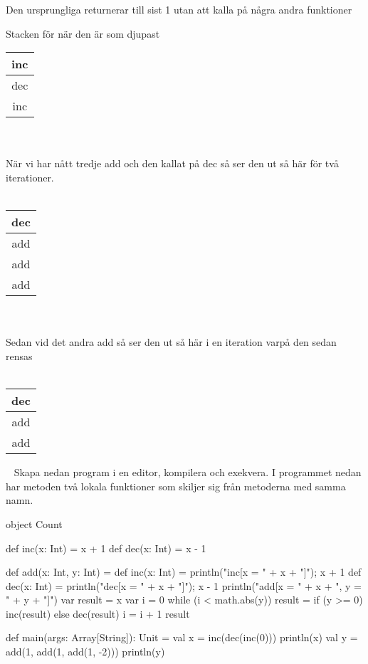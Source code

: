 Den ursprungliga  returnerar till sist 1 utan att kalla på några andra funktioner

\SubtaskSolved
Stacken för  när den är som djupast

\begin{tabular}{|c|}
\hline
inc \\
\hline
dec\\
\hline
inc \\
\hline
\end{tabular}
\\
\\
När vi har nått tredje add och den kallat på dec så ser den ut så här för två iterationer.
\\
\\
\begin{tabular}{|c|}

\hline
dec \\
\hline
add \\
\hline
add\\
\hline
add \\
\hline
\end{tabular}
\\
\\
Sedan vid det andra add så ser den ut så här i en iteration varpå den sedan rensas
\\
\\
\begin{tabular}{|c|}

\hline
dec \\
\hline
add \\
\hline
add\\
\hline
\end{tabular}



\QUESTEND









\QUESTBEGIN

\Task  \what~  Skapa nedan program i en editor, kompilera och exekvera. I programmet nedan har metoden  två lokala funktioner som skiljer sig från metoderna med samma namn.
\begin{Code}
object Count {
  def inc(x: Int) = x + 1
  def dec(x: Int) = x - 1

  def add(x: Int, y: Int) = {
    def inc(x: Int) = {println("inc[x = " + x + "]"); x + 1}
    def dec(x: Int) = {println("dec[x = " + x + "]"); x - 1}
    println("add[x = " + x + ", y = " + y + "]")
    var result = x
    var i = 0
    while (i < math.abs(y)){
      result = if (y >= 0) inc(result) else dec(result)
      i = i + 1
    }
    result
  }

  def main(args: Array[String]): Unit = {
    val x =  inc(dec(inc(0)))
    println(x)
    val y = add(1, add(1, add(1, -2)))
    println(y)
  }
}
\end{Code}

